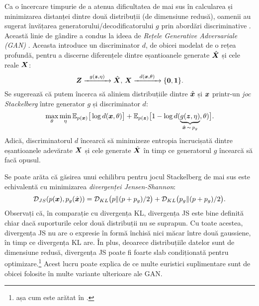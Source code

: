 \documentclass[../../book-main_ro.tex]{subfiles}
\begin{document}
Ca o încercare timpurie de a atenua dificultatea de mai sus în calcularea și minimizarea distanței dintre două distribuții (de dimensiune redusă), oamenii au sugerat învățarea generatorului/decodificatorului $g$ prin abordări discriminative \cite{Tu-2007}. Această linie de gândire a condus la ideea de {\em Rețele Generative Adversariale (GAN)} \cite{goodfellow2014generative}. Aceasta introduce un discriminator $d$, de obicei modelat de o rețea profundă, pentru a discerne diferențele dintre eșantioanele generate $\hat {\bm{X}}$ și cele reale $\bm{X}$:
\begin{equation}
 \bm{Z} \xrightarrow{\hspace{2mm} g(\bm{z},\eta) \hspace{2mm}} \hat {\bm{X}}, \, \bm{X} \xrightarrow{\hspace{2mm} d(\bm{x}, \theta)\hspace{2mm}} \{\mathbf 0, \mathbf 1\}.
 \label{eqn:GAN}
\end{equation}
Se sugerează că putem încerca să aliniem distribuțiile dintre $\hat {\bm{x}}$ și $\bm{x}$ printr-un {\em joc Stackelberg} între generator $g$ și discriminator $d$:
\begin{equation}
\max_{\theta}\min_{\eta} \mathbb{E}_{p({\bm{x}})}\big[\log d(\bm{x},\theta)\big] + \mathbb{E}_{p({\bm{z}})}\big[1 - \log d(\underbrace{g(\bm{z},\eta)}_{\hat {\bm{x}} \,\sim\, p_g},\theta)\big].
\end{equation}
Adică, discriminatorul $d$ încearcă să minimizeze entropia încrucișată dintre eșantioanele adevărate $\bm{X}$ și cele generate $\hat {\bm{X}}$ în timp ce generatorul $g$ încearcă să facă opusul.

Se poate arăta că găsirea unui echilibru pentru jocul Stackelberg de mai sus este echivalentă cu minimizarea {\em divergenței Jensen-Shannon}:
\begin{equation}
    \mathcal{D}_{JS}(p(\bm{x}), p_g(\hat {\bm{x}})) = \mathcal{D}_{KL}\big(p \| (p + p_g)/{2}\big) + \mathcal{D}_{KL}\big(p_g \| (p + p_g)/{2}\big).
\end{equation}
Observați că, în comparație cu divergența KL, divergența JS este bine definită chiar dacă suporturile celor două distribuții nu se suprapun. Cu toate acestea, divergența JS nu are o expresie în formă închisă nici măcar între două gaussiene, în timp ce divergența KL are. În plus, deoarece distribuțiile datelor sunt de dimensiune redusă, divergența JS poate fi foarte slab condiționată pentru optimizare.\footnote{așa cum este arătat în \cite{arjovsky2017wasserstein}.} Acest lucru poate explica de ce multe euristici suplimentare sunt de obicei folosite în multe variante ulterioare ale GAN.
\end{document}

